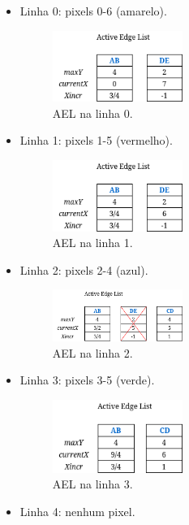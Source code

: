 \documentclass[12pt]{article}
\begin{document}
\begin{itemize}
    \item Linha 0: pixels 0-6 (amarelo).
\begin{figure}[H]
    \centering
    \includegraphics[width=0.4\textwidth]{images/3/3a_ael0.png}
    \caption*{AEL na linha 0.}
\end{figure}
    \item Linha 1: pixels 1-5 (vermelho).

\begin{figure}[H]
    \centering
    \includegraphics[width=0.4\textwidth]{images/3/3a_ael1.png}
    \caption*{AEL na linha 1.}
\end{figure}
    \item Linha 2: pixels 2-4 (azul).

\begin{figure}[H]
    \centering
    \includegraphics[width=0.4\textwidth]{images/3/3a_ael2.png}
    \caption*{AEL na linha 2.}
\end{figure}
    \item Linha 3: pixels 3-5 (verde).

\begin{figure}[H]
    \centering
    \includegraphics[width=0.4\textwidth]{images/3/3a_ael3.png}
    \caption*{AEL na linha 3.}
\end{figure}
    \item Linha 4: nenhum pixel.


\end{itemize}
\end{document}
